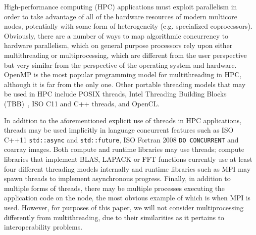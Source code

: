 High-performance computing (HPC) applications must exploit parallelism
in order to take advantage of all of the hardware resources of
modern multicore nodes, potentially with some form of heterogeneity
(e.g. specialized coprocessors).
Obviously, there are a number of ways to map algorithmic concurrency
to hardware parallelism, which on general purpose processors rely
upon either multithreading or multiprocessing, which are different
from the user perspective but very similar from the perspective of
the operating system and hardware.
OpenMP is the most popular programming model for multithreading in HPC,
although it is far from the only one.
Other portable threading models that may be used in HPC include
POSIX threads,
Intel\regtm{} Threading Building Blocks (TBB)~\cite{pheatt2008intel},
ISO\othertm{} C11 and C++ threads, and
OpenCL\othertm.

In addition to the aforementioned explicit use of threads in HPC applications,
threads may be used implicitly in language concurrent features such as
ISO C++11 \texttt{std::async} and \texttt{std::future},
ISO Fortran 2008 \texttt{DO CONCURRENT} and coarray images.
Both compute and runtime libraries may use threads;
compute libraries that implement BLAS, LAPACK or FFT functions
currently use at least four different threading models internally and
runtime libraries such as MPI may spawn threads to implement asynchronous progress.
Finally, in addition to multiple forms of threads, there may be multiple
processes executing the application code on the node, the most obvious example
of which is when MPI is used.  However, for purposes of this paper, we will
not consider multiprocessing differently from multithreading,
due to their similarities as it pertains to interoperability problems.

